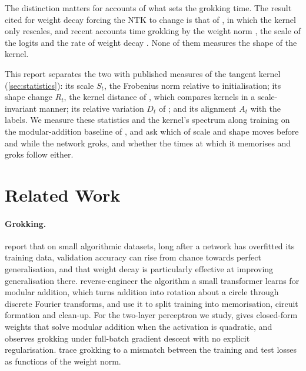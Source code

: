 \documentclass[a4paper,11pt]{article} %
\begin{document}
The distinction matters for accounts of what sets the grokking time. The result
cited for weight decay forcing the NTK to change
\citep{kumarGrokkingTransitionLazy2024} is that of
\citet{lewkowyczTrainingDynamicsDeep2021}, in which the kernel only rescales,
and recent accounts time grokking by the weight norm
\citep{khanhWeightNormSets2026}, the scale of the logits
\citep{khanhWhatDoesWeight2026} and the rate of weight decay
\citep{kimGrokkingWeightDecayClock2026}. None of them measures the shape of the
kernel.

This report separates the two with published measures of the tangent kernel
(\cref{sec:statistics}): its scale $S_t$, the Frobenius norm relative to
initialisation; its shape change $R_t$, the kernel distance of
\citet{fortDeepLearningKernel2020}, which compares kernels in a scale-invariant
manner; its relative variation $D_t$ of
\citet{geigerDisentanglingFeatureLazy2020}; and its alignment $A_t$ with the
labels. We measure these statistics and the kernel's spectrum along training on
the modular-addition baseline of
\citet{kumarGrokkingTransitionLazy2024}, and ask which of scale and shape moves
before and while the network groks, and whether the times at which it memorises
and groks follow either.

\section{Related Work}

\paragraph{Grokking.} 
report that on small algorithmic datasets, long after a network has overfitted
its training data, validation accuracy can rise from chance towards perfect
generalisation, and that weight decay is particularly effective at improving
generalisation there.  reverse-engineer
the algorithm a small transformer learns for modular addition, which turns
addition into rotation about a circle through discrete Fourier transforms, and
use it to split training into memorisation, circuit formation and clean-up.
For the two-layer perceptron we study,
\citet{gromovGrokkingModularArithmetic2023}
gives closed-form weights that solve modular addition when the activation is
quadratic, and observes grokking under full-batch gradient descent with no
explicit regularisation.  trace
grokking to a mismatch between the training and test losses as functions of
the weight norm.
\end{document}
